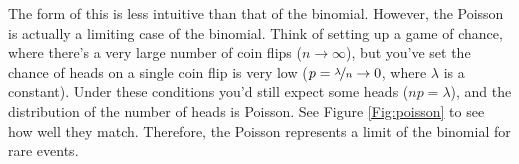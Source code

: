 \begin{description}
 The form of this is less intuitive than that of the
 binomial. However, the Poisson is actually a limiting case of the
 binomial. Think of setting up a game of chance, where there's a very large number of coin
 flips ($n \rightarrow \infty$), but you've set the chance of heads on a single
 coin flip is very low ($p = \nicefrac{\lambda}{n} \rightarrow 0$,
 where $\lambda$ is a constant).  Under these conditions you'd still
 expect some heads ($np =\lambda$), and the distribution of the number
 of heads is Poisson.  See Figure \ref{Fig:poisson} to see how well
 they match. Therefore, the Poisson represents a limit of
the binomial for rare events. 
\end{description}

